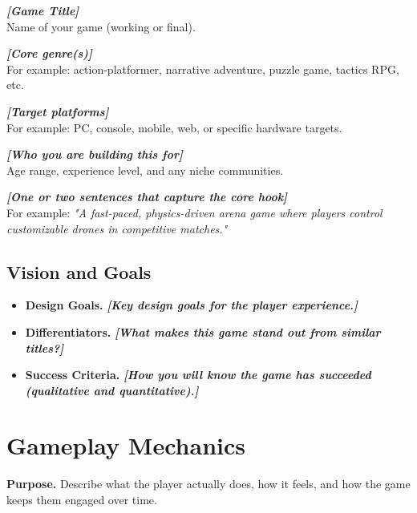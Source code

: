 \documentclass[12pt]{article}
\newcommand{\placeholder}[1]{\textbf{\textit{[#1]}}}
\begin{document}
\begin{description}[leftmargin=3.2cm, labelsep=0.8cm, style=nextline]
    \item[Title]
        \placeholder{Game Title} \\
        Name of your game (working or final).
    \item[Genre]
        \placeholder{Core genre(s)} \\
        For example: action-platformer, narrative adventure, puzzle game, tactics RPG, etc.
    \item[Platform(s)]
        \placeholder{Target platforms} \\
        For example: PC, console, mobile, web, or specific hardware targets.
    \item[Target Audience]
        \placeholder{Who you are building this for} \\
        Age range, experience level, and any niche communities.
    \item[Elevator Pitch]
        \placeholder{One or two sentences that capture the core hook} \\
        For example: \textit{"A fast-paced, physics-driven arena game where players control
        customizable drones in competitive matches."}
\end{description}

\subsection{Vision and Goals}

\begin{itemize}
    \item \textbf{Design Goals.} \placeholder{Key design goals for the player experience.}
    \item \textbf{Differentiators.} \placeholder{What makes this game stand out from similar titles?}
    \item \textbf{Success Criteria.} \placeholder{How you will know the game has succeeded (qualitative and quantitative).}
\end{itemize}

\section{Gameplay Mechanics}

\textbf{Purpose.} Describe what the player actually does, how it feels, and how the game keeps
them engaged over time.
\end{document}
